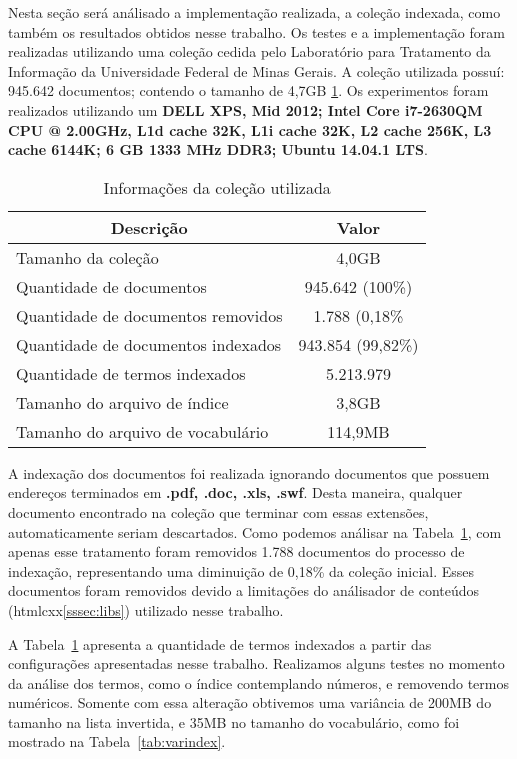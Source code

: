\documentclass[12pt]{article}
\begin{document}
Nesta seção será análisado a implementação realizada, a coleção indexada, como também os resultados obtidos nesse trabalho.
Os testes e a implementação foram realizadas utilizando uma coleção cedida pelo Laboratório para Tratamento da Informação da Universidade Federal de Minas Gerais. A coleção utilizada possuí: 945.642 documentos; contendo o tamanho de 4,7GB \ref{tab:infobase}. Os experimentos foram realizados utilizando um \textbf{DELL XPS, Mid 2012; Intel Core i7-2630QM CPU @ 2.00GHz, L1d cache 32K, L1i cache 32K, L2 cache 256K, L3 cache 6144K; 6 GB 1333 MHz DDR3; Ubuntu 14.04.1 LTS}.

\begin{table}
\centering
\begin{tabular}{|l|c|}
\hline
\multicolumn{1}{|c|}{Descrição}    & \multicolumn{1}{c|}{Valor} \\ \hline
Tamanho da coleção                 & 4,0GB                      \\ \hline
Quantidade de documentos           & 945.642 (100\%)            \\ \hline
Quantidade de documentos removidos & 1.788 (0,18\%              \\ \hline
Quantidade de documentos indexados & 943.854 (99,82\%)          \\ \hline
Quantidade de termos indexados     & 5.213.979                  \\ \hline
Tamanho do arquivo de índice       & 3,8GB                      \\ \hline
Tamanho do arquivo de vocabulário  & 114,9MB                    \\ \hline
\end{tabular}
\caption{Informações da coleção utilizada}
\label{tab:infobase}
\end{table}

A indexação dos documentos foi realizada ignorando documentos que possuem endereços terminados em \textbf{.pdf, .doc, .xls, .swf}. Desta maneira, qualquer documento encontrado na coleção que terminar com essas extensões, automaticamente seriam descartados. Como podemos análisar na Tabela~\ref{tab:infobase}, com apenas esse tratamento foram removidos 1.788 documentos do processo de indexação, representando uma diminuição de 0,18\% da coleção inicial. Esses documentos foram removidos devido a limitações do análisador de conteúdos (htmlcxx\ref{sssec:libs}) utilizado nesse trabalho.

A Tabela~\ref{tab:infobase} apresenta a quantidade de termos indexados a partir das configurações apresentadas nesse trabalho. Realizamos alguns testes no momento da análise dos termos, como o índice contemplando números, e removendo termos numéricos. Somente com essa alteração obtivemos uma variância de 200MB do tamanho na lista invertida, e 35MB no tamanho do vocabulário, como foi mostrado na Tabela~\ref{tab:varindex}.
\end{document}
